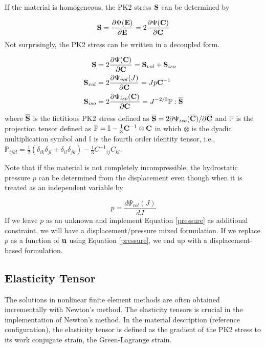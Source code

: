 If the material is homogeneous, the PK2 stress $\bold{S}$ can be determined by 

\begin{equation}
\bold{S}  = \frac{\partial\Psi(\bold{E})}{\partial{\bold{E}}} = 2\frac{\partial\Psi(\bold{C})}{\partial{\bold{C}}}\end{equation}
Not surprisingly, the PK2 stress can be written in a decoupled form.

\begin{subequations}
\label{S}
\begin{align}
\bold{S} &=  2\frac{\partial{\Psi({\bold{C})}}}{\partial{\bold{C}}} = \bold{S}_{vol}  + \bold{S}_{iso} 
\label {Stotal} \\
\bold{S}_{vol} &= 2\frac{\partial{\Psi_{vol}(J)}}{\partial{\bold{C}}} = Jp{\bold{C}} ^{-1} \label{Svol} \\
\bold{S}_{iso}  &= 2\frac{\partial{\Psi_{iso}({\overline{\bold{C}})}}}{\partial{\bold{C}}} = J^{-2/3}\mathbb{P}:\overline{\bold{S}}
\label{Siso}
\end{align}
\end{subequations}
where  $\overline{\bold{S}}$ is the fictitious PK2 stress defined as
$\overline{\bold{S}} = 2{\partial\Psi_{iso}({\overline{\bold{C}})}} / {\partial\overline{\bold{C}}}$
and $\mathbb{P}$ is the projection tensor defined as $\mathbb{P} = \mathbb{I} - \frac{1}{3}\bold{C}^{-1} \otimes \bold{C} $ in which $\otimes$ is the dyadic multiplication symbol and $\mathbb{I}$ is the fourth order identity tensor, i.e.,  $\mathbb{P}_{ijkl} =  \frac{1}{2}(\delta_{ik}\delta_{jl} + \delta_{il}\delta_{jk}) - \frac{1}{3} {{C}^{-1}}_{ij} {C}_{kl}$.

Note that if the material is not completely incompressible, the hydrostatic pressure $p$ can be determined from the displacement even though when it is treated as an independent variable by

\begin{equation} \label{pressure}
p = \frac{d\Psi_{vol}(J)}{dJ}
\end{equation}
If we leave $p$ as an unknown and implement Equation \ref{pressure} as additional constraint, we will have a displacement/pressure mixed formulation. If we replace $p$ as a function of $\bold{u}$ using Equation \ref{pressure}, we end up with a displacement-based formulation.

%
\subsection{Elasticity Tensor} \label{general_elasticity}
The solutions in nonlinear finite element methods are often obtained incrementally with Newton's method. The elasticity tensors is crucial in the implementation of Newton's method.
In the material description (reference configuration), the elasticity tensor is defined as the gradient of the PK2 stress to its work conjugate strain, the Green-Lagrange strain.

